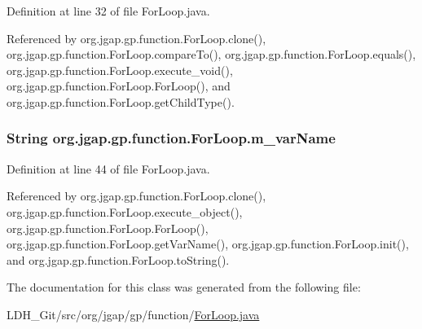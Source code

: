 Definition at line 32 of file For\-Loop.\-java.



Referenced by org.\-jgap.\-gp.\-function.\-For\-Loop.\-clone(), org.\-jgap.\-gp.\-function.\-For\-Loop.\-compare\-To(), org.\-jgap.\-gp.\-function.\-For\-Loop.\-equals(), org.\-jgap.\-gp.\-function.\-For\-Loop.\-execute\-\_\-void(), org.\-jgap.\-gp.\-function.\-For\-Loop.\-For\-Loop(), and org.\-jgap.\-gp.\-function.\-For\-Loop.\-get\-Child\-Type().

\hypertarget{classorg_1_1jgap_1_1gp_1_1function_1_1_for_loop_aa2dea4a97e8bf2eac31539568dfbebfe}{
\subsubsection[{m\-\_\-var\-Name}]{\setlength{\rightskip}{0pt plus 5cm}String org.\-jgap.\-gp.\-function.\-For\-Loop.\-m\-\_\-var\-Name\hspace{0.3cm}{\ttfamily [private]}}}\label{classorg_1_1jgap_1_1gp_1_1function_1_1_for_loop_aa2dea4a97e8bf2eac31539568dfbebfe}


Definition at line 44 of file For\-Loop.\-java.



Referenced by org.\-jgap.\-gp.\-function.\-For\-Loop.\-clone(), org.\-jgap.\-gp.\-function.\-For\-Loop.\-execute\-\_\-object(), org.\-jgap.\-gp.\-function.\-For\-Loop.\-For\-Loop(), org.\-jgap.\-gp.\-function.\-For\-Loop.\-get\-Var\-Name(), org.\-jgap.\-gp.\-function.\-For\-Loop.\-init(), and org.\-jgap.\-gp.\-function.\-For\-Loop.\-to\-String().



The documentation for this class was generated from the following file\-:\begin{DoxyCompactItemize}
\item 
L\-D\-H\-\_\-\-Git/src/org/jgap/gp/function/\hyperlink{_for_loop_8java}{For\-Loop.\-java}\end{DoxyCompactItemize}
